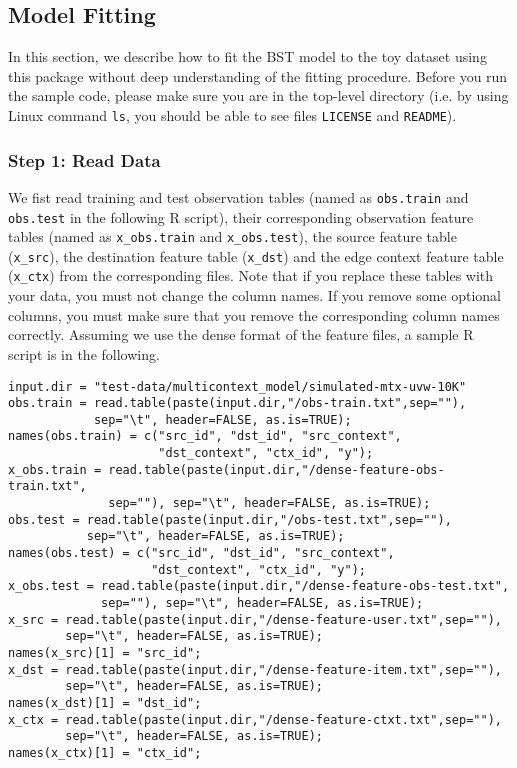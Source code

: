 
\subsection{Model Fitting}
\label{sec:bst-quick-start}

In this section, we describe how to fit the BST model to the toy dataset using this package without deep understanding of the fitting procedure.  Before you run the sample code, please make sure you are in the top-level directory (i.e. by using Linux command {\tt ls}, you should be able to see files {\tt LICENSE} and {\tt README}).

\subsubsection{Step 1: Read Data}
\label{sec:read-data}

We fist read training and test observation tables (named as {\tt obs.train} and {\tt obs.test} in the following R script), their corresponding observation feature tables (named as {\tt x\_obs.train} and {\tt x\_obs.test}), the source feature table ({\tt x\_src}), the destination feature table ({\tt x\_dst}) and the edge context feature table ({\tt x\_ctx}) from the corresponding files.  Note that if you replace these tables with your data, you must not change the column names.  If you remove some optional columns, you must make sure that you remove the corresponding column names correctly. Assuming we use the dense format of the feature files, a sample R script is in the following.
{\small\begin{verbatim}
input.dir = "test-data/multicontext_model/simulated-mtx-uvw-10K"
obs.train = read.table(paste(input.dir,"/obs-train.txt",sep=""), 
            sep="\t", header=FALSE, as.is=TRUE);
names(obs.train) = c("src_id", "dst_id", "src_context", 
                     "dst_context", "ctx_id", "y");
x_obs.train = read.table(paste(input.dir,"/dense-feature-obs-train.txt",
              sep=""), sep="\t", header=FALSE, as.is=TRUE);
obs.test = read.table(paste(input.dir,"/obs-test.txt",sep=""), 
           sep="\t", header=FALSE, as.is=TRUE);
names(obs.test) = c("src_id", "dst_id", "src_context", 
                    "dst_context", "ctx_id", "y");
x_obs.test = read.table(paste(input.dir,"/dense-feature-obs-test.txt",
             sep=""), sep="\t", header=FALSE, as.is=TRUE);
x_src = read.table(paste(input.dir,"/dense-feature-user.txt",sep=""),
        sep="\t", header=FALSE, as.is=TRUE);
names(x_src)[1] = "src_id";
x_dst = read.table(paste(input.dir,"/dense-feature-item.txt",sep=""),
        sep="\t", header=FALSE, as.is=TRUE);
names(x_dst)[1] = "dst_id";
x_ctx = read.table(paste(input.dir,"/dense-feature-ctxt.txt",sep=""),
        sep="\t", header=FALSE, as.is=TRUE);
names(x_ctx)[1] = "ctx_id";
\end{verbatim}}

